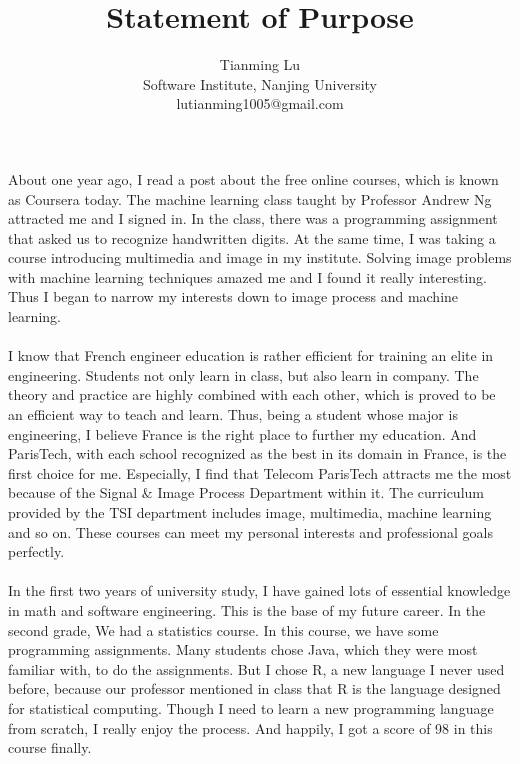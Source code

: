 \documentclass[a4paper]{article}
\title{Statement of Purpose}
\author{Tianming Lu \\
		Software Institute, Nanjing University\\
		lutianming1005@gmail.com}
\date{}
\begin{document}
\maketitle\thispagestyle{mystyle}
\paragraph{}
About one year ago, I read a post about the free online courses, which is known as Coursera today. The machine learning class taught by Professor Andrew Ng attracted me and I signed in. In the class, there was a programming assignment that asked us to recognize handwritten digits. At the same time, I was taking a course introducing multimedia and image in my institute. Solving image problems with machine learning techniques amazed me and I found it really interesting. Thus I began to narrow my interests down to image process and machine learning.
\paragraph{}
I know that French engineer education is rather efficient for training an elite in engineering. Students not only learn in class, but also learn in company. The theory and practice are highly combined with each other, which is proved to be an efficient way to teach and learn. Thus, being a student whose major is engineering, I believe France is the right place to further my education. And ParisTech, with each school recognized as the best in its domain in France, is the first choice for me. Especially, I find that Telecom ParisTech attracts me the most because of the Signal \& Image Process Department within it. The curriculum provided by the TSI department includes image, multimedia, machine learning and so on. These courses can meet my personal interests and professional goals perfectly.
\paragraph{}
In the first two years of university study, I have gained lots of essential knowledge in math and software engineering. This is the base of my future career. In the second grade, We had a statistics course. In this course, we have some programming assignments. Many students chose Java, which they were most familiar with, to do the assignments. But I chose R, a new language I never used before, because our professor mentioned in class that R is the language designed for statistical computing. Though I need to learn a new programming language from scratch, I really enjoy the process. And happily, I got a score of 98 in this course finally.
\end{document}

